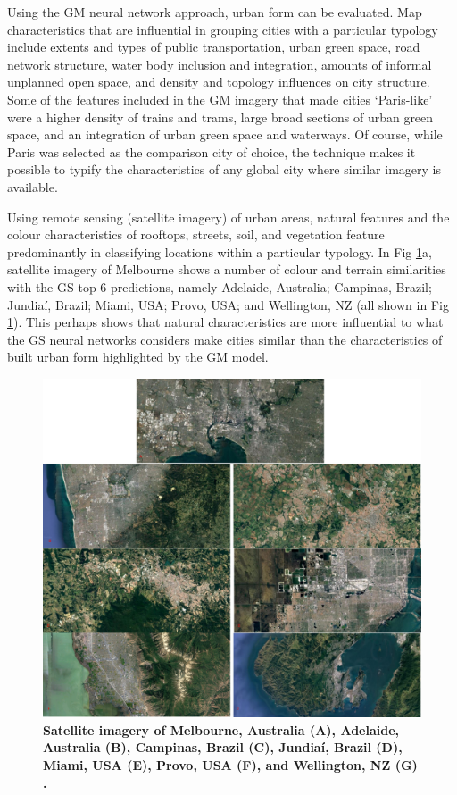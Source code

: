 \documentclass[Crown,sageh,times]{sagej}
\begin{document}
Using the GM neural network approach, urban form can be evaluated. Map characteristics that are influential in grouping cities with a particular typology include extents and types of public transportation, urban green space, road network structure, water body inclusion and integration, amounts of informal unplanned open space, and density and topology influences on city structure. Some of the features included in the GM imagery that made cities `Paris-like' were a higher density of trains and trams, large broad sections of urban green space, and an integration of urban green space and waterways. Of course, while Paris was selected as the comparison city of choice, the technique makes it possible to typify the characteristics of any global city where similar imagery is available.

Using remote sensing (satellite imagery) of urban areas, natural features and the colour characteristics of rooftops, streets, soil, and vegetation feature predominantly in classifying locations within a particular typology. In Fig \ref{fig:satimages}a, satellite imagery of Melbourne shows a number of colour and terrain similarities with the GS top 6 predictions, namely Adelaide, Australia; Campinas, Brazil; Jundia\'{i}, Brazil; Miami, USA; Provo, USA; and Wellington, NZ (all shown in Fig \ref{fig:satimages}). This perhaps shows that natural characteristics are more influential to what the GS neural networks considers make cities similar than the characteristics of built urban form highlighted by the GM model.

\begin{figure}[!htbp]
\centering    
\includegraphics[scale=0.35]{Images/PlosOne/Fig14.png} 
 \caption{\bf Satellite imagery of Melbourne, Australia (A), Adelaide, Australia (B), Campinas, Brazil (C), Jundia\'{i}, Brazil (D), Miami, USA (E), Provo, USA (F), and Wellington, NZ (G) \cite{GoogleStatic2017}.}    
 \label{fig:satimages}  
\end{figure} 
\end{document}
